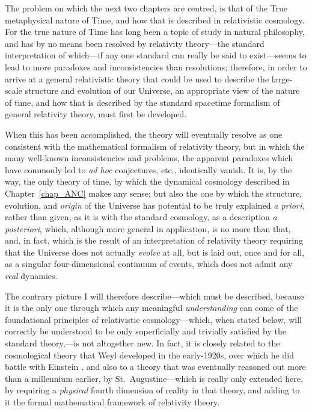 The problem on which the next two chapters are centred, is that of the True metaphysical nature of Time, and how that is described in relativistic cosmology. For the true nature of Time has long been a topic of study in natural philosophy, and has by no means been resolved by relativity theory---the standard interpretation of which---if any one standard can really be said to exist---seems to lead to more paradoxes and inconsistencies than resolutions; therefore, in order to arrive at a general relativistic theory that could be used to describe the large-scale structure and evolution of our Universe, an appropriate view of the nature of time, and how that is described by the standard spacetime formalism of general relativity theory, must first be developed.

When this has been accomplished, the theory will eventually resolve as one consistent with the mathematical formalism of relativity theory, but in which the many well-known inconsistencies and problems, the apparent paradoxes which have commonly led to \textit{ad hoc} conjectures, etc., identically vanish. It is, by the way, the only theory of time, by which the dynamical cosmology described in Chapter~\ref{chap_ANC} makes any sense; but also the one by which the structure, evolution, and \textit{origin} of the Universe has potential to be truly explained \textit{a priori}, rather than given, as it is with the standard cosmology, as a description \textit{a posteriori}, which, although more general in application, is no more than that, and, in fact, which is the result of an interpretation of relativity theory requiring that the Universe does not actually \textit{evolve} at all, but is laid out, once and for all, as a singular four-dimensional continuum of events, which does not admit any \textit{real} dynamics.

The contrary picture I will therefore describe---which must be described, because it is the only one through which any meaningful \textit{understanding} can come of the foundational principles of relativistic cosmology---which, when stated below, will correctly be understood to be only superficially and trivially satisfied by the standard theory,---is not altogether new. In fact, it is closely related to the cosmological theory that Weyl developed in the early-1920s, over which he did battle with Einstein \cite{Weyl1924}, and also to a theory that was eventually reasoned out more than a millennium earlier, by St.~Augustine---which is really only extended here, by requiring a \textit{physical} fourth dimension of reality in that theory, and adding to it the formal mathematical framework of relativity theory. 

